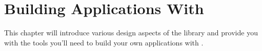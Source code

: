 \chapter{Building Applications With \vtyui}

This chapter will introduce various design aspects of the library and
provide you with the tools you'll need to build your own applications
with \vtyui.






